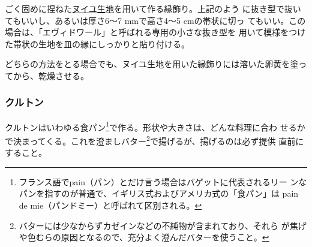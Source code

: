 \begin{recette}
ごく固めに捏ねた\protect\hyperlink{nouilles}{ヌイユ生地}を用いて作る縁飾り。上記のよう
に抜き型で抜いてもいいし、あるいは厚さ6〜7 mmで高さ4〜5 cmの帯状に切っ
てもいい。この場合は、「エヴィドワール」と呼ばれる専用の小さな抜き型を
用いて模様をつけた帯状の生地を皿の縁にしっかりと貼り付ける。

どちらの方法をとる場合でも、ヌイユ生地を用いた縁飾りには溶いた卵黄を塗ってから、乾燥させる。

\hypertarget{croutons}{%
\subsubsection{クルトン}\label{croutons}}



クルトンはいわゆる食パン\footnote{フランス語でpain（パン）とだけ言う場合はバゲットに代表されるリー
  ンなパンを指すのが普通で、イギリス式およびアメリカ式の「食パン」は
  pain de mie（パンドミー）と呼ばれて区別される。}で作る。形状や大きさは、どんな料理に合わ
せるかで決まってくる。これを澄ましバター\footnote{バターには少なからずカゼインなどの不純物が含まれており、それら
  が焦げや色むらの原因となるので、充分よく澄んだバターを使うこと。}で揚げるが、揚げるのは必ず提供
直前にすること。

\hypertarget{duxelles-seche}{%
}
\end{recette}
